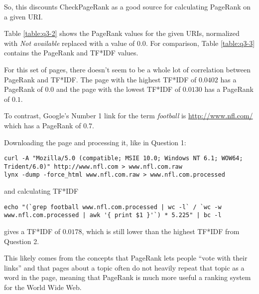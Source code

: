 \documentclass[letterpaper,11pt]{article}
\begin{document}
So, this discounts CheckPageRank as a good source for calculating PageRank on a given URI.

Table \ref{table:q3-2} shows the PageRank values for the given URIs, normalized with \emph{Not available} replaced with a value of $0.0$.  For comparison, Table \ref{table:q3-3} contains the PageRank and TF*IDF values.

For this set of pages, there doesn't seem to be a whole lot of correlation between PageRank and TF*IDF.  The page with the highest TF*IDF of $0.0402$ has a PageRank of $0.0$ and the page with the lowest TF*IDF of $0.0130$ has a PageRank of $0.1$.

To contrast, Google's Number 1 link for the term \emph{football} is \url{http://www.nfl.com/} which has a PageRank of $0.7$.

Downloading the page and processing it, like in Question 1:
\begin{lstlisting}[frame=single]
curl -A "Mozilla/5.0 (compatible; MSIE 10.0; Windows NT 6.1; WOW64; Trident/6.0)" http://www.nfl.com > www.nfl.com.raw
lynx -dump -force_html www.nfl.com.raw > www.nfl.com.processed
\end{lstlisting}

and calculating TF*IDF
\begin{lstlisting}[frame=single]
echo "(`grep football www.nfl.com.processed | wc -l` / `wc -w www.nfl.com.processed | awk '{ print $1 }'`) * 5.225" | bc -l
\end{lstlisting}
gives a TF*IDF of $0.0178$, which is still lower than the highest TF*IDF from Question 2.

This likely comes from the concepts that PageRank lets people ``vote with their links'' and that pages about a topic often do not heavily repeat that topic as a word in the page, meaning that PageRank is much more useful a ranking system for the World Wide Web.
\end{document}
